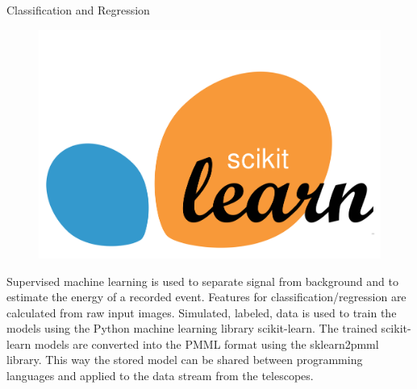\begin{multicols}{2}
    \begin{block}[]{Classification and Regression}%
      \begin{multicols}{2}
        \begin{figure}
          \includegraphics[width=0.9\linewidth]{logos/sklearn.png}\\
        \end{figure}
        \columnbreak
        Supervised machine learning is used to separate signal from background and to estimate
        the energy of a recorded event. Features for classification/regression are calculated from raw input
        images.
        Simulated, labeled, data is used to train the models using the Python machine learning library scikit-learn\cite{sklearn}.
        The trained scikit-learn models are converted into the PMML\cite{pmml} format using the sklearn2pmml\cite{sklearn2pmml} library.
        This way the stored model can be shared
        between programming languages and applied to the data stream from the telescopes.
      \end{multicols}
    \end{block}%


\end{multicols}
